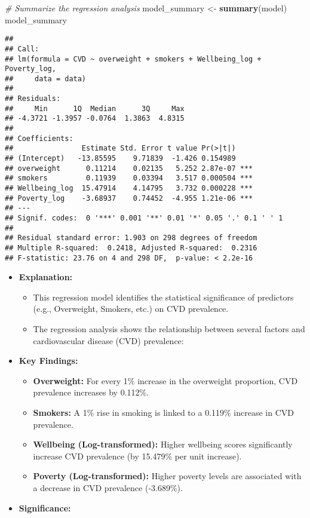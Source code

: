 \documentclass[
]{article}
\newenvironment{Shaded}{\begin{snugshade}}{\end{snugshade}}
\newcommand{\CommentTok}[1]{\textcolor[rgb]{0.56,0.35,0.01}{\textit{#1}}}
\newcommand{\FunctionTok}[1]{\textcolor[rgb]{0.13,0.29,0.53}{\textbf{#1}}}
\newcommand{\NormalTok}[1]{#1}
\newcommand{\OtherTok}[1]{\textcolor[rgb]{0.56,0.35,0.01}{#1}}
\begin{document}
\begin{Shaded}
\begin{Highlighting}[]
\CommentTok{\# Summarize the regression analysis}
\NormalTok{model\_summary }\OtherTok{\textless{}{-}} \FunctionTok{summary}\NormalTok{(model)}
\NormalTok{model\_summary}
\end{Highlighting}
\end{Shaded}

\begin{verbatim}
## 
## Call:
## lm(formula = CVD ~ overweight + smokers + Wellbeing_log + Poverty_log, 
##     data = data)
## 
## Residuals:
##     Min      1Q  Median      3Q     Max 
## -4.3721 -1.3957 -0.0764  1.3863  4.8315 
## 
## Coefficients:
##                Estimate Std. Error t value Pr(>|t|)    
## (Intercept)   -13.85595    9.71839  -1.426 0.154989    
## overweight      0.11214    0.02135   5.252 2.87e-07 ***
## smokers         0.11939    0.03394   3.517 0.000504 ***
## Wellbeing_log  15.47914    4.14795   3.732 0.000228 ***
## Poverty_log    -3.68937    0.74452  -4.955 1.21e-06 ***
## ---
## Signif. codes:  0 '***' 0.001 '**' 0.01 '*' 0.05 '.' 0.1 ' ' 1
## 
## Residual standard error: 1.903 on 298 degrees of freedom
## Multiple R-squared:  0.2418, Adjusted R-squared:  0.2316 
## F-statistic: 23.76 on 4 and 298 DF,  p-value: < 2.2e-16
\end{verbatim}

\begin{itemize}
\item
  \textbf{Explanation:}

  \begin{itemize}
  \item
    This regression model identifies the statistical significance of
    predictors (e.g., Overweight, Smokers, etc.) on CVD prevalence.
  \item
    The regression analysis shows the relationship between several
    factors and cardiovascular disease (CVD) prevalence:
  \end{itemize}
\item
  \textbf{Key Findings:}

  \begin{itemize}
  \item
    \textbf{Overweight:} For every 1\% increase in the overweight
    proportion, CVD prevalence increases by 0.112\%.
  \item
    \textbf{Smokers:} A 1\% rise in smoking is linked to a 0.119\%
    increase in CVD prevalence.
  \item
    \textbf{Wellbeing (Log-transformed):} Higher wellbeing scores
    significantly increase CVD prevalence (by 15.479\% per unit
    increase).
  \item
    \textbf{Poverty (Log-transformed):} Higher poverty levels are
    associated with a decrease in CVD prevalence (-3.689\%).
  \end{itemize}
\item
  \textbf{Significance:}
\end{itemize}
\end{document}
